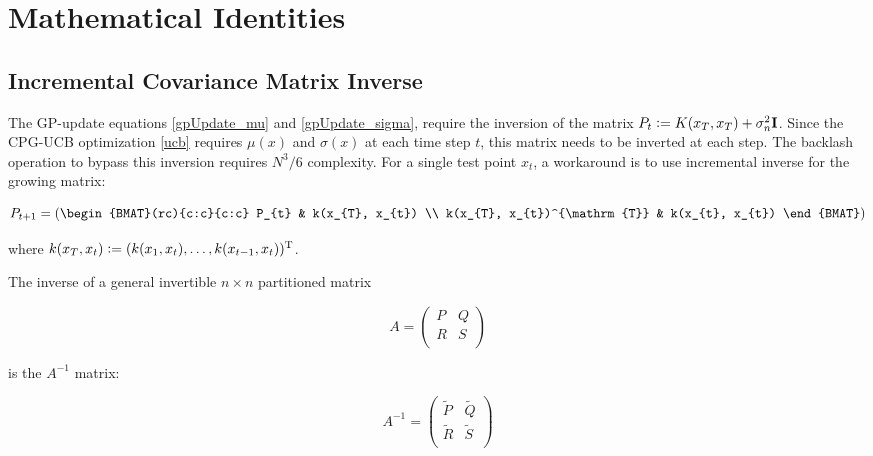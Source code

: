 \chapter{Mathematical Identities}\label{app:math}

\section{Incremental Covariance Matrix Inverse}

The GP-update equations \eqref{gpUpdate_mu} and \eqref{gpUpdate_sigma}, require the inversion of the matrix $P_{t} \mathrel{\mathop:}= K(x_{T}, x_{T}) + \sigma_{n}^{2}\mathbf{I}$. Since the CPG-UCB optimization \eqref{ucb} requires $\mu(x)$ and $\sigma(x)$ at each time step $t$, this matrix needs to be inverted at each step. The backlash operation to bypass this inversion requires $N^{3}/6$ complexity. For a single test point $x_{t}$, a workaround is to use incremental inverse for the growing matrix:

\begin{equation}
P_{t+1} = 
\left(
\begin{BMAT}(rc){c:c}{c:c}
P_{t} & k(x_{T}, x_{t}) \\
k(x_{T}, x_{t})^{\mathrm{T}} & k(x_{t}, x_{t})
\end{BMAT} 
\right)
\label{CovMat}
\end{equation}

where $k(x_{T}, x_{t}) \mathrel{\mathop:}= (k(x_{1}, x_{t}), \ldots, k(x_{t-1}, x_{t	}))^{\mathrm{T}}$. 

The inverse of a general invertible $n \times n$ partitioned matrix 

\begin{equation*}
A = 
\left(
\begin{array}{cc}
P & Q \\
R & S \\
\end{array} 
\right)
\end{equation*}

is the $A^{-1}$ matrix:

\begin{equation*}
A^{-1} = 
\left(
\begin{array}{cc}
\tilde{P} & \tilde{Q} \\
\tilde{R} & \tilde{S} \\
\end{array} 
\right)
\end{equation*}

